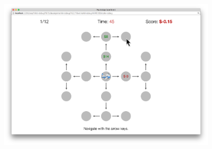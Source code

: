 \documentclass[final]{beamer}
\newlength{\sepwid}
\newlength{\twocolwid}
\begin{document}
\begin{frame}[t, fragile]
\begin{columns}[t]
\begin{column}{\sepwid}\end{column} %
\begin{column}{\twocolwid} %
  \vspace{-1cm}
  \begin{figure}
    \label{fig:main}
    \includegraphics[width=0.85\linewidth]{figs/example1.png}
  \end{figure}

  \vspace{-1cm}


\end{column}
\end{columns}
\end{frame}
\end{document}
